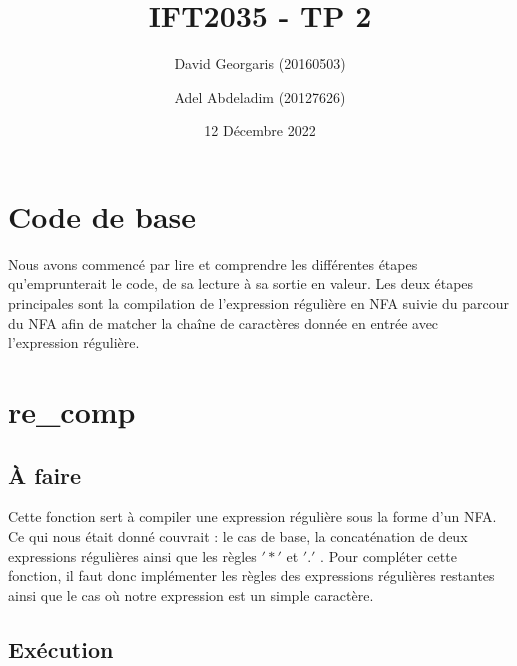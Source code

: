 \documentclass{article}
\title{IFT2035 - TP 2}
\author{David Georgaris (20160503) \and Adel Abdeladim (20127626) }
\date{12 Décembre 2022}
\begin{document}
\maketitle
\section{Code de base}
    Nous avons commencé par lire et comprendre les différentes étapes 
    qu'emprunterait le code, de sa lecture à sa sortie en valeur. Les 
    deux étapes principales sont la compilation de l'expression régulière
    en NFA suivie du parcour du NFA afin de matcher la chaîne de caractères 
    donnée en entrée avec l'expression régulière. \\

    
\section{re\_comp}
\subsection{À faire}

   Cette fonction sert à compiler une expression régulière sous la forme d'un
   NFA. Ce qui nous était donné couvrait : le cas de base, la concaténation de 
   deux expressions régulières ainsi que les règles $'*'$ et $'.'$ . Pour 
   compléter cette fonction, il faut donc implémenter les règles des expressions 
   régulières restantes ainsi que le cas où notre expression est un simple caractère.
    
 \subsection{Exécution}
 
\end{document}
